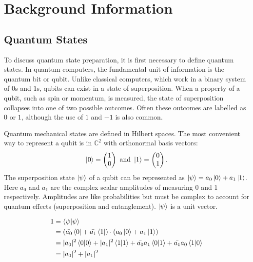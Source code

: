 \documentclass[{../RL_for_QSP.tex}]{subfiles}
\begin{document}
    \section{Background Information}
    \label{sec:BI}

\subsection{Quantum States}   
To discuss quantum state preparation, it is first necessary to define quantum states. In quantum computers, the fundamental unit of information is the quantum bit or qubit. Unlike classical computers, which work in a binary system of $0$s and $1$s, qubits can exist in a state of superposition. When a property of a qubit, such as spin or momentum, is measured, the state of superposition collapses into one of two possible outcomes. Often these outcomes are labelled as $0$ or $1$, although the use of $1$ and $-1$ is also common. 

Quantum mechanical states are defined in Hilbert spaces. The most convenient way to represent a qubit is in $\mathbb{C}^2$ with orthonormal basis vectors:
\begin{equation*}
    \ket{0} = \begin{pmatrix}1\\ 0\end{pmatrix} \text{ and }\\
    \ket{1} = \begin{pmatrix}0\\ 1\end{pmatrix}.
\end{equation*}
The superposition state $\ket{\psi}$ of a qubit can be represented as $\ket{\psi} = a_0\ket{0} + a_1\ket{1}$. Here $a_0$ and $a_1$ are the complex scalar amplitudes of measuring $0$ and $1$ respectively. Amplitudes are like probabilities but must be complex to account for quantum effects (superposition and entanglement). $\ket{\psi}$ is a unit vector.

\begin{equation*}
\begin{aligned}
1 &= \braket{\psi} \\
&= (\bar{a_0}\bra{0} + \bar{a_1}\bra{1}) \cdot (a_0\ket{0} + a_1\ket{1}) \\
&= |a_0|^2\braket{0} + |a_1|^2\braket{1} + \bar{a_0}a_1\braket{0}{1} + \bar{a_1}a_0\braket{1}{0} \\
&= |a_0|^2 + |a_1|^2
\end{aligned}
\end{equation*}
\end{document}
